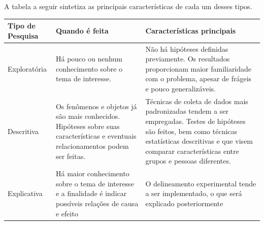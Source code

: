 \documentclass[
]{book}
\begin{document}
A tabela a seguir sintetiza as principais características de cada um desses tipos.

\begin{longtable}[]{@{}lll@{}}
\toprule
\begin{minipage}[b]{0.30\columnwidth}\raggedright
Tipo de Pesquisa\strut
\end{minipage} & \begin{minipage}[b]{0.30\columnwidth}\raggedright
Quando é feita\strut
\end{minipage} & \begin{minipage}[b]{0.30\columnwidth}\raggedright
Características principais\strut
\end{minipage}\tabularnewline
\midrule
\endhead
\begin{minipage}[t]{0.30\columnwidth}\raggedright
Exploratória\strut
\end{minipage} & \begin{minipage}[t]{0.30\columnwidth}\raggedright
Há pouco ou nenhum conhecimento sobre o tema de interesse.\strut
\end{minipage} & \begin{minipage}[t]{0.30\columnwidth}\raggedright
Não há hipóteses definidas previamente. Os resultados proporcionam maior familiaridade com o problema, apesar de frágeis e pouco generalizáveis.\strut
\end{minipage}\tabularnewline
\begin{minipage}[t]{0.30\columnwidth}\raggedright
Descritiva\strut
\end{minipage} & \begin{minipage}[t]{0.30\columnwidth}\raggedright
Os fenômenos e objetos já são mais conhecidos. Hipóteses sobre suas características e eventuais relacionamentos podem ser feitas.\strut
\end{minipage} & \begin{minipage}[t]{0.30\columnwidth}\raggedright
Técnicas de coleta de dados mais padronizadas tendem a ser empregadas. Testes de hipóteses são feitos, bem como técnicas estatísticas descritivas e que visem comparar características entre grupos e pessoas diferentes.\strut
\end{minipage}\tabularnewline
\begin{minipage}[t]{0.30\columnwidth}\raggedright
Explicativa\strut
\end{minipage} & \begin{minipage}[t]{0.30\columnwidth}\raggedright
Há maior conhecimento sobre o tema de interesse e a finalidade é indicar possíveis relações de causa e efeito\strut
\end{minipage} & \begin{minipage}[t]{0.30\columnwidth}\raggedright
O delineamento experimental tende a ser implementado, o que será explicado posteriormente\strut
\end{minipage}\tabularnewline
\bottomrule
\end{longtable}
\end{document}
